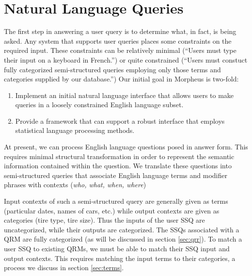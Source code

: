 \section{Natural Language Queries}
The first step in answering a user query is to determine what, in
fact, is being asked.  Any system that supports user queries places
some constraints on the required input.  These constraints can be
relatively minimal (``Users must type their input on a keyboard in
French.'') or quite constrained (``Users must constuct fully
categorized semi-structured queries employing only those terms and
categories supplied by our database.'')  Our initial goal in Morpheus
is two-fold:

\begin{enumerate}
\item Implement an initial natural language interface that allows
  users to make queries in a loosely constrained English language
  subset.
\item Provide a framework that can support a robust
  interface that employs statistical language processing
  methods.  
\end{enumerate}

At present, we can process English language questions posed in answer
form.  This requires minimal structural transformation in order to
represent the semantic information contained within the question.  We
translate these questions into semi-structured queries that associate
English language terms and modifier phrases with contexts (\emph{who,
  what, when, where})

Input contexts of such a semi-structured query are generally given as
terms (particular dates, names of cars, etc.) while output contexts
are given as categories (tire type, tire size). Thus the inputs of the
user SSQ are uncategorized, while their outputs are categorized.  The
SSQs associated with a QRM are fully categorized (as will be discussed
in section \ref{sec:qrr}). To match a user SSQ to existing QRMs, we
must be able to match their SSQ input and output contexts.  This
requires matching the input terms to their categories, a process we
discuss in section \ref{sec:terms}.
